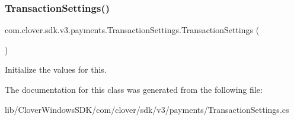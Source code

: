 \subsubsection{\texorpdfstring{Transaction\+Settings()}{TransactionSettings()}}
{\footnotesize\ttfamily com.\+clover.\+sdk.\+v3.\+payments.\+Transaction\+Settings.\+Transaction\+Settings (\begin{DoxyParamCaption}{ }\end{DoxyParamCaption})}

Initialize the values for this. 

The documentation for this class was generated from the following file\+:\begin{DoxyCompactItemize}
\item 
lib/\+Clover\+Windows\+S\+D\+K/com/clover/sdk/v3/payments/Transaction\+Settings.\+cs\end{DoxyCompactItemize}
